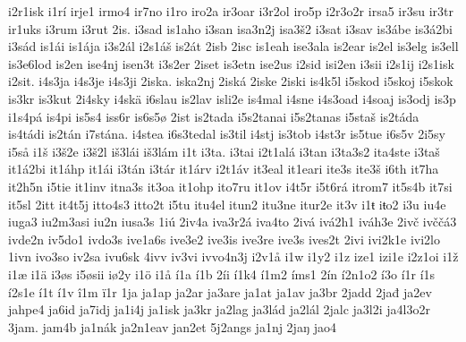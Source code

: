 {    i2r1isk
    i1rí
    irje1
    irmo4
    ir7no
    i1ro
    iro2a
    ir3oar
    i3r2ol
    iro5p
    i2r3o2r
    irsa5
    ir3su
    ir3tr
    ir1uks
    i3rum
    i3rut
    2is.
    i3sad
    is1aho
    i3san
    isa3n2j
    isa3š2
    i3sat
    i3sav
    is3ábe
    is3á2bi
    i3sád
    is1ái
    is1ája
    i3s2ál
    i2s1áš
    is2át
    2isb
    2isc
    is1eah
    ise3ala
    is2ear
    is2el
    is3elg
    is3ell
    is3e6lod
    is2en
    ise4nj
    isen3t
    i3s2er
    2iset
    is3etn
    ise2us
    i2sid
    isi2en
    i3sii
    i2s1ij
    i2s1isk
    i2sit.
    i4s3ja
    i4s3je
    i4s3ji
    2iska.
    iska2nj
    2iská
    2iske
    2iski
    is4k5l
    i5skod
    i5skoj
    i5skok
    is3kr
    is3kut
    2i4sky
    i4skä
    i6slau
    is2lav
    isli2e
    is4mal
    i4sne
    i4s3oad
    i4soaj
    is3odj
    is3p
    i1s4pá
    is4pi
    is5s4
    iss6r
    is6s5ø
    2ist
    is2tada
    i5s2tanai
    i5s2tanas
    i5staš
    is2táda
    is4tádi
    is2tán
    i7stána.
    i4stea
    i6s3tedal
    is3til
    i4stj
    is3tob
    i4st3r
    is5tue
    i6s5v
    2i5sy
    i5så
    i1š
    i3š2e
    i3š2l
    iš3lái
    iš3lám
    i1t
    i3ta.
    i3tai
    i2t1alá
    i3tan
    i3ta3s2
    ita4ste
    i3taš
    it1á2bi
    it1áhp
    it1ái
    i3tán
    i3tár
    it1árv
    i2t1áv
    it3eal
    it1eari
    ite3s
    ite3š
    i6th
    it7ha
    it2h5n
    i5tie
    it1inv
    itna3s
    it3oa
    it1ohp
    ito7ru
    it1ov
    i4t5r
    i5t6rá
    itrom7
    it5s4b
    it7si
    it5sl
    2itt
    it4t5j
    itto4s3
    itto2t
    i5tu
    itu4el
    itun2
    itu3ne
    itur2e
    it3v
    i1ŧ
    iŧo2
    i3u
    iu4e
    iuga3
    iu2m3asi
    iu2n
    iusa3s
    1iú
    2iv4a
    iva3r2á
    iva4to
    2ivá
    ivá2h1
    iváh3e
    2ivč
    ivččá3
    ivde2n
    iv5do1
    ivdo3s
    ive1a6s
    ive3e2
    ive3is
    ive3re
    ive3s
    ives2t
    2ivi
    ivi2k1e
    ivi2lo
    1ivn
    ivo3so
    iv2sa
    ivu6sk
    4ivv
    iv3vi
    ivvo4n3j
    i2v1å
    i1w
    i1y2
    i1z
    ize1
    izi1e
    i2z1oi
    i1ž
    i1æ
    i1ä
    i3øs
    i5øsii
    iø2y
    i1ö
    i1å
    í1a
    í1b
    2íi
    í1k4
    í1m2
    íms1
    2ín
    í2n1o2
    í3o
    í1r
    í1s
    í2s1e
    í1t
    í1v
    î1m
    ï1r
    1ja
    ja1ap
    ja2ar
    ja3are
    ja1at
    ja1av
    ja3br
    2jadd
    2jađ
    ja2ev
    jahpe4
    ja6id
    ja7idj
    ja1i4j
    ja1isk
    ja3kr
    ja2lag
    ja3lád
    ja2lál
    2jalc
    ja3l2i
    ja4l3o2r
    3jam.
    jam4b
    ja1nák
    ja2n1eav
    jan2et
    5j2angs
    ja1nj
    2jaŋ
    jao4
}
